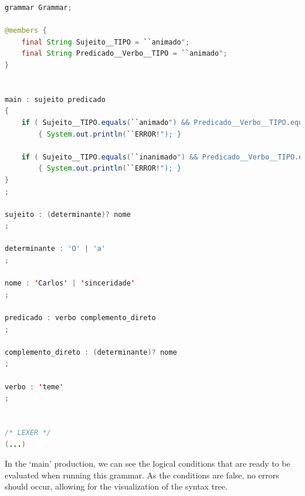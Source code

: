 \begin{center}
\begin{minipage}{15cm}
\begin{lstlisting}[language=java, basicstyle=\tiny, label={lst:case_study_sentence}, caption=Example of a specific generated grammar.]
grammar Grammar;

@members {
    final String Sujeito__TIPO = ``animado";
    final String Predicado__Verbo__TIPO = ``animado";
}


main : sujeito predicado
{
    if ( Sujeito__TIPO.equals(``animado") && Predicado__Verbo__TIPO.equals(``inanimado") ) 
        { System.out.println(``ERROR!"); }

    if ( Sujeito__TIPO.equals(``inanimado") && Predicado__Verbo__TIPO.equals(``animado") ) 
        { System.out.println(``ERROR!"); }
}
;

sujeito : (determinante)? nome 
;

determinante : 'O' | 'a'
;

nome : 'Carlos' | 'sinceridade'
;

predicado : verbo complemento_direto 
;

complemento_direto : (determinante)? nome 
;

verbo : 'teme'
;


/* LEXER */
(...)
\end{lstlisting}
\end{minipage}
\end{center}

In the ‘main’ production, we can see the logical conditions that are ready to be evaluated when running this grammar. As the conditions are false, no errors should occur,
allowing for the visualization of the syntax tree.


%
%
%
%
%


